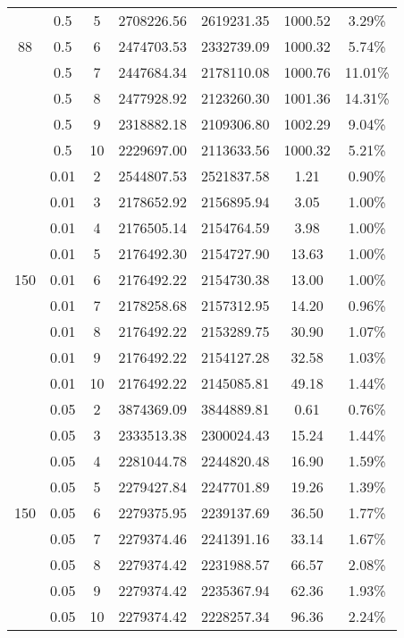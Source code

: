 {\begin{longtable}{cccrrcc}
        & 0.5   & 5     & 2708226.56 & 2619231.35 & 1000.52  & 3.29\% \\
  88    & 0.5   & 6     & 2474703.53 & 2332739.09 & 1000.32  & 5.74\% \\
        & 0.5   & 7     & 2447684.34 & 2178110.08 & 1000.76  & 11.01\% \\
        & 0.5   & 8     & 2477928.92 & 2123260.30 & 1001.36  & 14.31\% \\
        & 0.5   & 9     & 2318882.18 & 2109306.80 & 1002.29  & 9.04\% \\
        & 0.5   & 10    & 2229697.00 & 2113633.56 & 1000.32  & 5.21\% \\
        \cmidrule(r){2-7}
        & 0.01  & 2     & 2544807.53 & 2521837.58 & 1.21  & 0.90\% \\
        & 0.01  & 3     & 2178652.92 & 2156895.94 & 3.05  & 1.00\% \\
        & 0.01  & 4     & 2176505.14 & 2154764.59 & 3.98  & 1.00\% \\
        & 0.01  & 5     & 2176492.30 & 2154727.90 & 13.63 & 1.00\% \\
  150   & 0.01  & 6     & 2176492.22 & 2154730.38 & 13.00 & 1.00\% \\
        & 0.01  & 7     & 2178258.68 & 2157312.95 & 14.20 & 0.96\% \\
        & 0.01  & 8     & 2176492.22 & 2153289.75 & 30.90 & 1.07\% \\
        & 0.01  & 9     & 2176492.22 & 2154127.28 & 32.58 & 1.03\% \\
        & 0.01  & 10    & 2176492.22 & 2145085.81 & 49.18 & 1.44\% \\
        & 0.05  & 2     & 3874369.09 & 3844889.81 & 0.61  & 0.76\% \\
        & 0.05  & 3     & 2333513.38 & 2300024.43 & 15.24 & 1.44\% \\
        & 0.05  & 4     & 2281044.78 & 2244820.48 & 16.90 & 1.59\% \\
        & 0.05  & 5     & 2279427.84 & 2247701.89 & 19.26 & 1.39\% \\
  150   & 0.05  & 6     & 2279375.95 & 2239137.69 & 36.50 & 1.77\% \\
        & 0.05  & 7     & 2279374.46 & 2241391.16 & 33.14 & 1.67\% \\
        & 0.05  & 8     & 2279374.42 & 2231988.57 & 66.57 & 2.08\% \\
        & 0.05  & 9     & 2279374.42 & 2235367.94 & 62.36 & 1.93\% \\
        & 0.05  & 10    & 2279374.42 & 2228257.34 & 96.36 & 2.24\% \\

\end{longtable}}

